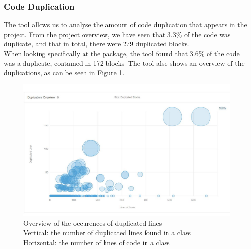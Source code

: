         \subsubsection{Code Duplication}
            The tool allows us to analyse the amount of code duplication that appears in the project. From the project overview, we have seen that 3.3\% of the code was duplicate, and that in total, there were 279 duplicated blocks. \\
            When looking specifically at the  package, the tool found that 3.6\% of the code was a duplicate, contained in 172 blocks.
            The tool also shows an overview of the duplications, as can be seen in  Figure \ref{fig:duplicatelines}. 
            \begin{figure}[H]
                \centering
                \includegraphics[scale=1]{figures/duplicatedlines.JPG}
                \caption{Overview of the occurences of duplicated lines\\
                        Vertical: the number of duplicated lines found in a class\\
                        Horizontal: the number of lines of code in a class}
                \label{fig:duplicatelines}
            \end{figure}
            
